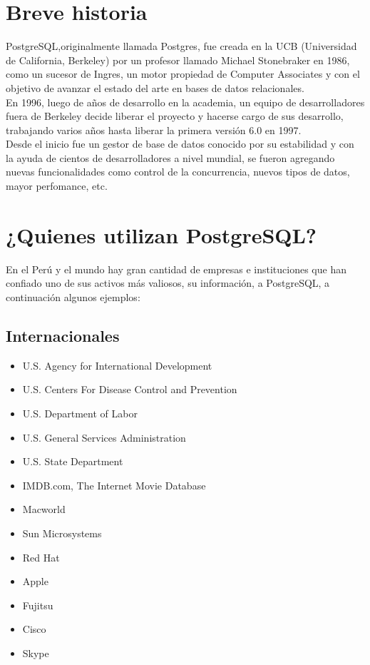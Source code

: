 
\section{Breve historia}

PostgreSQL,originalmente llamada Postgres, fue creada en la UCB (Universidad de California, Berkeley) por un profesor llamado Michael Stonebraker en 1986, como un sucesor de Ingres, un motor propiedad de Computer Associates y con el objetivo de avanzar el estado del arte en bases de datos relacionales.\\

En 1996, luego de años de desarrollo en la academia, un equipo de desarrolladores fuera de Berkeley decide liberar el proyecto y hacerse cargo de sus desarrollo, trabajando varios años hasta liberar la primera versión 6.0 en 1997.\\

Desde el inicio fue un gestor de base de datos conocido por su estabilidad y con la ayuda de cientos de desarrolladores a nivel mundial, se fueron agregando nuevas funcionalidades como control de la concurrencia, nuevos tipos de datos, mayor perfomance, etc.\\


\section{¿Quienes utilizan PostgreSQL?}

En el Perú y el mundo hay gran cantidad de empresas e instituciones que han confiado uno de sus activos más valiosos, su información, a PostgreSQL, a continuación algunos ejemplos:

\subsection{Internacionales}

\begin{itemize}
\item U.S. Agency for International Development
\item U.S. Centers For Disease Control and Prevention
\item U.S. Department of Labor
\item U.S. General Services Administration
\item U.S. State Department
\item IMDB.com, The Internet Movie Database
\item Macworld
\item Sun Microsystems
\item Red Hat
\item Apple
\item Fujitsu
\item Cisco 
\item Skype
\end{itemize}

